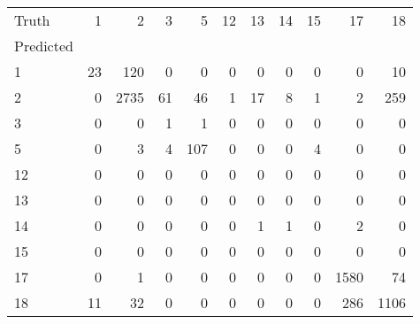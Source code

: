 \begin{tabular}{lrrrrrrrrrr}
\toprule
Truth & 1 & 2 & 3 & 5 & 12 & 13 & 14 & 15 & 17 & 18 \\
Predicted &  &  &  &  &  &  &  &  &  &  \\
\midrule
1 & 23 & 120 & 0 & 0 & 0 & 0 & 0 & 0 & 0 & 10 \\
2 & 0 & 2735 & 61 & 46 & 1 & 17 & 8 & 1 & 2 & 259 \\
3 & 0 & 0 & 1 & 1 & 0 & 0 & 0 & 0 & 0 & 0 \\
5 & 0 & 3 & 4 & 107 & 0 & 0 & 0 & 4 & 0 & 0 \\
12 & 0 & 0 & 0 & 0 & 0 & 0 & 0 & 0 & 0 & 0 \\
13 & 0 & 0 & 0 & 0 & 0 & 0 & 0 & 0 & 0 & 0 \\
14 & 0 & 0 & 0 & 0 & 0 & 1 & 1 & 0 & 2 & 0 \\
15 & 0 & 0 & 0 & 0 & 0 & 0 & 0 & 0 & 0 & 0 \\
17 & 0 & 1 & 0 & 0 & 0 & 0 & 0 & 0 & 1580 & 74 \\
18 & 11 & 32 & 0 & 0 & 0 & 0 & 0 & 0 & 286 & 1106 \\
\bottomrule
\end{tabular}
